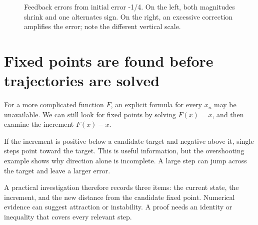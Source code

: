 \documentclass[11pt,oneside,openany]{book}
\theoremstyle{definition}
\theoremstyle{remark}
\numberwithin{equation}{chapter}
\begin{document}
\begin{figure}[htbp]\centering
{}
\caption{Feedback errors from initial error -1/4. On the left, both magnitudes shrink and one alternates sign. On the right, an excessive correction amplifies the error; note the different vertical scale.}\end{figure}

\section{Fixed points are found before trajectories are solved}\label{ch02-fixed-points-are-found-before-trajectories-are-solved}

For a more complicated function \(F\), an explicit formula for every \(x_n\) may be unavailable. We can still look for fixed points by solving \(F(x)=x\), and then examine the increment \(F(x)-x\).

If the increment is positive below a candidate target and negative above it, single steps point toward the target. This is useful information, but the overshooting example shows why direction alone is incomplete. A large step can jump across the target and leave a larger error.

A practical investigation therefore records three items: the current state, the increment, and the new distance from the candidate fixed point. Numerical evidence can suggest attraction or instability. A proof needs an identity or inequality that covers every relevant step.
\end{document}
